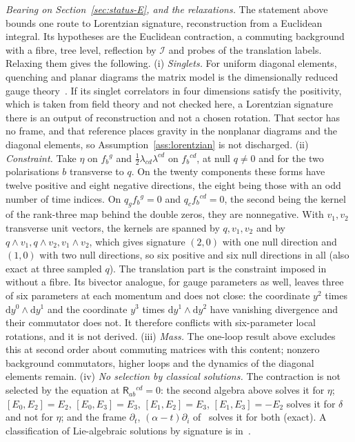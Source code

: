 \emph{Bearing on Section~\ref{sec:status-E}, and the relaxations.} The statement above bounds one route to Lorentzian signature, reconstruction from a Euclidean integral. Its hypotheses are the Euclidean contraction, a commuting background with a fibre, tree level, reflection by \(\mathcal I\) and probes of the translation labels. Relaxing them gives the following. (i) \emph{Singlets.} For uniform diagonal elements, quenching and planar diagrams the matrix model is the dimensionally reduced gauge theory~\cite{HoKawaiSteinacker2025}. If its singlet correlators in four dimensions satisfy the positivity, which is taken from field theory and not checked here, a Lorentzian signature there is an output of reconstruction and not a chosen rotation. That sector has no frame, and that reference places gravity in the nonplanar diagrams and the diagonal elements, so Assumption~\ref{ass:lorentzian} is not discharged. (ii) \emph{Constraint.} Take \(\eta\) on \(f_b{}^g\) and \(\tfrac12\lambda_{cd}\lambda^{cd}\) on \(f_b{}^{cd}\), at null \(q\neq0\) and for the two polarisations \(b\) transverse to \(q\). On the twenty components these forms have twelve positive and eight negative directions, the eight being those with an odd number of time indices. On \(q_gf_b{}^g=0\) and \(q_cf_b{}^{cd}=0\), the second being the kernel of the rank-three map behind the double zeros, they are nonnegative. With \(v_1,v_2\) transverse unit vectors, the kernels are spanned by \(q,v_1,v_2\) and by \(q\wedge v_1,q\wedge v_2,v_1\wedge v_2\), which gives signature \((2,0)\) with one null direction and \((1,0)\) with two null directions, so six positive and six null directions in all (also exact at three sampled \(q\)). The translation part is the constraint imposed in~\cite{HoKawaiSteinacker2025} without a fibre. Its bivector analogue, for gauge parameters as well, leaves three of six parameters at each momentum and does not close: the coordinate \(y^2\) times \(\mathrm dy^0\wedge\mathrm dy^1\) and the coordinate \(y^3\) times \(\mathrm dy^1\wedge\mathrm dy^2\) have vanishing divergence and their commutator does not. It therefore conflicts with six-parameter local rotations, and it is not derived. (iii) \emph{Mass.} The one-loop result above excludes this at second order about commuting matrices with this content; nonzero background commutators, higher loops and the dynamics of the diagonal elements remain. (iv) \emph{No selection by classical solutions.} The contraction is not selected by the equation at \(\mathsf R_{ab}{}^{cd}=0\): the second algebra above solves it for \(\eta\); \([E_0,E_2]=E_2\), \([E_0,E_3]=E_3\), \([E_1,E_2]=E_3\), \([E_1,E_3]=-E_2\) solves it for \(\delta\) and not for \(\eta\); and the frame \(\partial_t\), \((\alpha-t)\partial_i\) of~\cite{IsonoTomino2010} solves it for both (exact). A classification of Lie-algebraic solutions by signature is in~\cite{Liao2026}.


